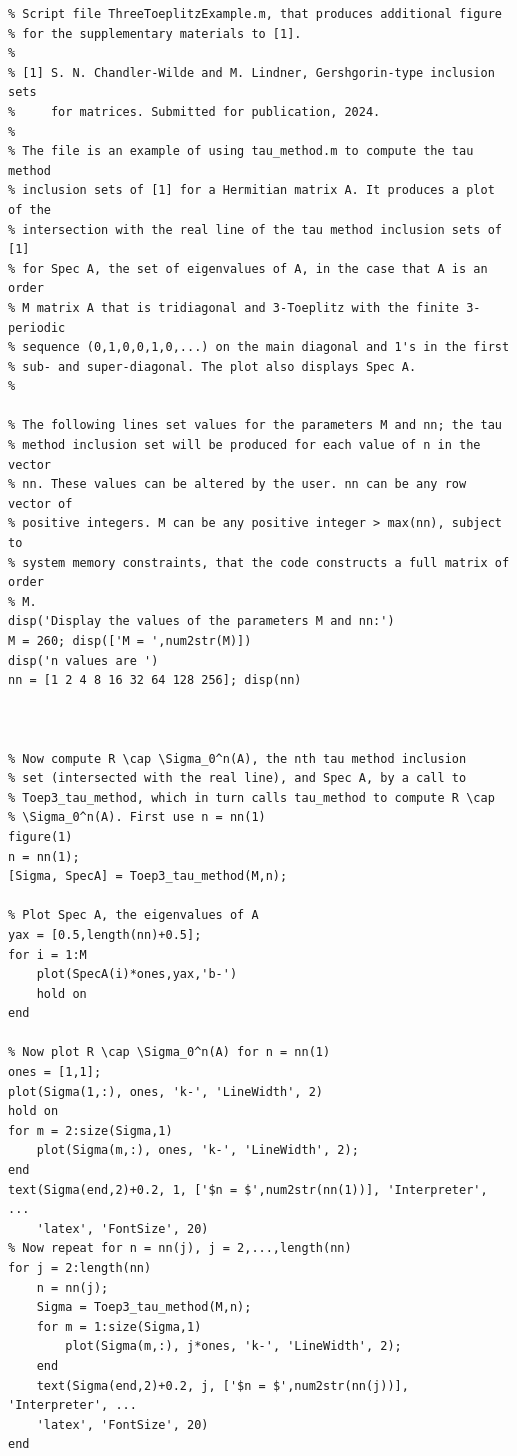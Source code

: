 \documentclass[preprint,1p,11pt]{elsarticle}
\numberwithin{equation}{section}   %
\numberwithin{figure}{section}  %
\begin{document}
\begin{verbatim}
% Script file ThreeToeplitzExample.m, that produces additional figure
% for the supplementary materials to [1].
%
% [1] S. N. Chandler-Wilde and M. Lindner, Gershgorin-type inclusion sets
%     for matrices. Submitted for publication, 2024.
%
% The file is an example of using tau_method.m to compute the tau method
% inclusion sets of [1] for a Hermitian matrix A. It produces a plot of the 
% intersection with the real line of the tau method inclusion sets of [1] 
% for Spec A, the set of eigenvalues of A, in the case that A is an order 
% M matrix A that is tridiagonal and 3-Toeplitz with the finite 3-periodic
% sequence (0,1,0,0,1,0,...) on the main diagonal and 1's in the first 
% sub- and super-diagonal. The plot also displays Spec A. 
%

% The following lines set values for the parameters M and nn; the tau
% method inclusion set will be produced for each value of n in the vector
% nn. These values can be altered by the user. nn can be any row vector of
% positive integers. M can be any positive integer > max(nn), subject to
% system memory constraints, that the code constructs a full matrix of order
% M.
disp('Display the values of the parameters M and nn:')
M = 260; disp(['M = ',num2str(M)])
disp('n values are ')
nn = [1 2 4 8 16 32 64 128 256]; disp(nn)



% Now compute R \cap \Sigma_0^n(A), the nth tau method inclusion
% set (intersected with the real line), and Spec A, by a call to
% Toep3_tau_method, which in turn calls tau_method to compute R \cap 
% \Sigma_0^n(A). First use n = nn(1)
figure(1)
n = nn(1);
[Sigma, SpecA] = Toep3_tau_method(M,n);

% Plot Spec A, the eigenvalues of A
yax = [0.5,length(nn)+0.5];
for i = 1:M
    plot(SpecA(i)*ones,yax,'b-')
    hold on
end

% Now plot R \cap \Sigma_0^n(A) for n = nn(1)
ones = [1,1];
plot(Sigma(1,:), ones, 'k-', 'LineWidth', 2)
hold on
for m = 2:size(Sigma,1)
    plot(Sigma(m,:), ones, 'k-', 'LineWidth', 2);
end
text(Sigma(end,2)+0.2, 1, ['$n = $',num2str(nn(1))], 'Interpreter', ...
    'latex', 'FontSize', 20)
% Now repeat for n = nn(j), j = 2,...,length(nn)
for j = 2:length(nn)
    n = nn(j);
    Sigma = Toep3_tau_method(M,n);
    for m = 1:size(Sigma,1)
        plot(Sigma(m,:), j*ones, 'k-', 'LineWidth', 2);
    end
    text(Sigma(end,2)+0.2, j, ['$n = $',num2str(nn(j))], 'Interpreter', ...
    'latex', 'FontSize', 20)
end


\end{verbatim}
\end{document}
